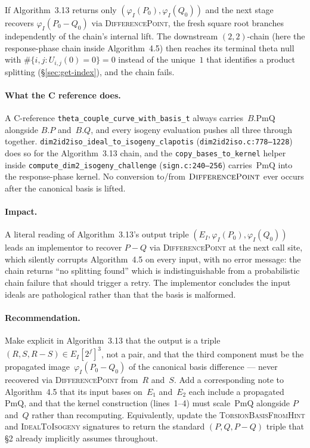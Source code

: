 \documentclass[a4paper,11pt]{article}
\newcommand{\algo}[1]{Algorithm~#1}
\begin{document}
If \algo{3.13} returns only $(\varphi_I(P_0), \varphi_I(Q_0))$
and the next stage recovers $\varphi_I(P_0 - Q_0)$ via
\textsc{DifferencePoint}, the fresh square root branches
independently of the chain's internal lift.  The downstream
$(2, 2)$-chain (here the response-phase chain inside
\algo{4.5}) then reaches its terminal theta null with
$\#\{i, j : U_{i, j}(0) = 0\} = 0$ instead of the unique~$1$
that identifies a product splitting (\S\ref{sec:get-index}),
and the chain fails.

\paragraph{What the C reference does.}
A C-reference \texttt{theta\_couple\_curve\_with\_basis\_t}
always carries~$B.\mathrm{PmQ}$ alongside $B.P$ and~$B.Q$, and
every isogeny evaluation pushes all three through together.
\texttt{dim2id2iso\_ideal\_to\_isogeny\_clapotis}
(\texttt{dim2id2iso.c:778--1228}) does so for the
\algo{3.13} chain, and the \texttt{copy\_bases\_to\_kernel}
helper inside \texttt{compute\_dim2\_isogeny\_challenge}
(\texttt{sign.c:240--256}) carries~$\mathrm{PmQ}$ into the
response-phase kernel.  No conversion to/from
$\textsc{DifferencePoint}$ ever occurs after the canonical
basis is lifted.

\paragraph{Impact.}
A literal reading of \algo{3.13}'s output triple
$(E_I, \varphi_I(P_0), \varphi_I(Q_0))$ leads an implementor to
recover $P{-}Q$ via \textsc{DifferencePoint} at the next call
site, which silently corrupts \algo{4.5} on every input, with
no error message: the chain returns ``no splitting found''
which is indistinguishable from a probabilistic chain failure
that should trigger a retry.  The implementor concludes the
input ideals are pathological rather than that the basis is
malformed.

\paragraph{Recommendation.}
Make explicit in \algo{3.13} that the output is a triple
$(R, S, R{-}S) \in E_I[2^f]^3$, not a pair, and that the third
component must be the propagated image~$\varphi_I(P_0 - Q_0)$ of
the canonical basis difference --- never recovered via
\textsc{DifferencePoint} from~$R$ and~$S$.  Add a corresponding
note to \algo{4.5} that its input bases on~$E_1$ and~$E_2$ each
include a propagated~$\mathrm{PmQ}$, and that the kernel
construction (lines~1--4) must scale~$\mathrm{PmQ}$ alongside
$P$ and~$Q$ rather than recomputing.  Equivalently, update the
\textsc{TorsionBasisFromHint} and \textsc{IdealToIsogeny} signatures
to return the standard $(P, Q, P{-}Q)$ triple that \S2 already
implicitly assumes throughout.
\end{document}
